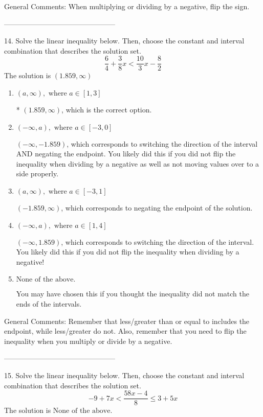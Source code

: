 \documentclass{extbook}[14pt]
\begin{document}
General Comments: When multiplying or dividing by a negative, flip the sign.

-----------------------------------------------

14. Solve the linear inequality below. Then, choose the constant and interval combination that describes the solution set.
\[ \frac{6}{4} + \frac{3}{8} x < \frac{10}{3} x - \frac{8}{2} \] 
The solution is $ (1.859, \infty) $ 

\begin{enumerate}[label=\Alph*.] 
\item $ (a, \infty), \text{ where } a \in [1, 3] $ 

 * $(1.859, \infty)$, which is the correct option. 
\item $ (-\infty, a), \text{ where } a \in [-3, 0] $ 

  $(-\infty, -1.859)$, which corresponds to switching the direction of the interval AND negating the endpoint. You likely did this if you did not flip the inequality when dividing by a negative as well as not moving values over to a side properly. 
\item $ (a, \infty), \text{ where } a \in [-3, 1] $ 

  $(-1.859, \infty)$, which corresponds to negating the endpoint of the solution. 
\item $ (-\infty, a), \text{ where } a \in [1, 4] $ 

  $(-\infty, 1.859)$, which corresponds to switching the direction of the interval. You likely did this if you did not flip the inequality when dividing by a negative! 
\item $ \text{None of the above}. $ 

 You may have chosen this if you thought the inequality did not match the ends of the intervals. 
\end{enumerate} 
 
General Comments: Remember that less/greater than or equal to includes the endpoint, while less/greater do not. Also, remember that you need to flip the inequality when you multiply or divide by a negative.

-----------------------------------------------

15. Solve the linear inequality below. Then, choose the constant and interval combination that describes the solution set.
\[ -9 + 7 x < \frac{58 x - 4}{8} \leq 3 + 5 x \] 
The solution is $ \text{None of the above.} $ 
\end{document}
